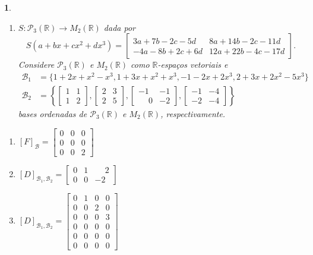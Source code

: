 \documentclass[12pt]{exam}
\newtheorem{exercicio}{}
\newcommand{\real}{\mathbb{R}}
\begin{document}
\begin{exercicio}
\begin{enumerate}[label=({\alph*})]
    \item $S : \mathcal{P}_3(\real) \to M_2(\real)$ dada por
    \[
      S(a + bx + cx^2 + dx^3) = \begin{bmatrix}
        3a + 7b - 2c - 5d & 8a + 14b - 2c - 11d\\
        -4a - 8b + 2c + 6d & 12a + 22b - 4c - 17d
      \end{bmatrix}.
    \]
    Considere $\mathcal{P}_3(\real)$ e $M_2(\real)$ como $\real$-espaços vetoriais e
    \begin{align*}
      \mathcal{B}_1 &= \{1 + 2x + x^2 - x^3, 1 + 3x + x^2 + x^3, -1 - 2x + 2x^3, 2 + 3x + 2x^2 - 5x^3\}\\
      \mathcal{B}_2 &= \left\{\begin{bmatrix}
        1 & 1\\1 & 2
      \end{bmatrix}, \begin{bmatrix}
        2 & 3\\2 & 5
      \end{bmatrix}, \begin{bmatrix}
        -1 & -1\\\phantom{-}0 & -2
      \end{bmatrix}, \begin{bmatrix}
        -1 & -4\\-2 & -4
      \end{bmatrix}\right\} 
    \end{align*}
    bases ordenadas de $\mathcal{P}_3(\real)$ e $M_2(\real)$, respectivamente.
   \end{enumerate}
   \begin{solucao}
     \begin{enumerate}[label=({\alph*})]
        \item $[F]_\mathcal{B} = \begin{bmatrix}
           0 & 0 & 0\\
           0 & 0 & 0\\
           0 & 0 & 2
        \end{bmatrix}$

        \item $[D]_{\mathcal{B}_1, \mathcal{B}_2} = \begin{bmatrix}
          0 & 1 & \phantom{-}2\\
          0 & 0 & -2
        \end{bmatrix}$

        \item $[D]_{\mathcal{B}_1, \mathcal{B}_2} = \begin{bmatrix}
          0 & 1 & 0 & 0\\
          0 & 0 & 2 & 0\\
          0 & 0 & 0 & 3\\
          0 & 0 & 0 & 0\\
          0 & 0 & 0 & 0\\
          0 & 0 & 0 & 0
        \end{bmatrix}$


\end{enumerate}
\end{solucao}
\end{exercicio}
\end{document}
